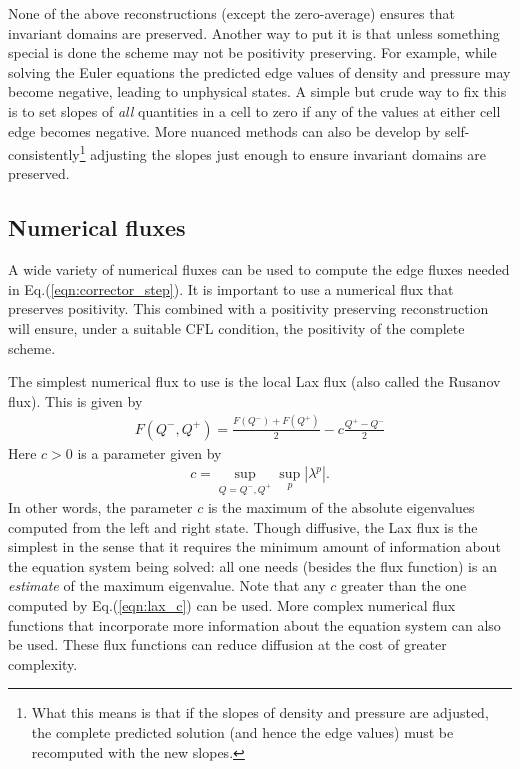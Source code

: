 \documentclass[12pt]{article}
\theoremstyle{definition}
\theoremstyle{definition}
\theoremstyle{definition}
\newcommand{\eqr}[1]{Eq.\thinspace(#1)}
\begin{document}
None of the above reconstructions (except the zero-average) ensures
that invariant domains are preserved. Another way to put it is that
unless something special is done the scheme may not be positivity
preserving. For example, while solving the Euler equations the
predicted edge values of density and pressure may become negative,
leading to unphysical states. A simple but crude way to fix this is to
set slopes of \emph{all} quantities in a cell to zero if any of the
values at either cell edge becomes negative. More nuanced methods can
also be develop by self-consistently\footnote{What this means is that
  if the slopes of density and pressure are adjusted, the complete
  predicted solution (and hence the edge values) must be recomputed
  with the new slopes.} adjusting the slopes just enough to ensure
invariant domains are preserved.

\subsection{Numerical fluxes}

A wide variety of numerical fluxes can be used to compute the edge
fluxes needed in \eqr{\ref{eqn:corrector_step}}. It is important to
use a numerical flux that preserves positivity. This combined with a
positivity preserving reconstruction will ensure, under a suitable CFL
condition, the positivity of the complete scheme.

The simplest numerical flux to use is the local Lax flux (also called
the Rusanov flux). This is given by
\begin{align}
  F(Q^-,Q^+) = \frac{F(Q^-) + F(Q^+)}{2} - c\frac{Q^+- Q^-}{2}
\end{align}
Here $c>0$ is a parameter given by
\begin{align}
  c = \sup_{Q=Q^-,Q^+} \sup_p | \lambda^p |. \label{eqn:lax_c}
\end{align}
In other words, the parameter $c$ is the maximum of the absolute
eigenvalues computed from the left and right state. Though diffusive,
the Lax flux is the simplest in the sense that it requires the minimum
amount of information about the equation system being solved: all one
needs (besides the flux function) is an \emph{estimate} of the maximum
eigenvalue. Note that any $c$ greater than the one computed by
\eqr{\ref{eqn:lax_c}} can be used. More complex numerical flux
functions that incorporate more information about the equation system
can also be used. These flux functions can reduce diffusion at the
cost of greater complexity.
\end{document}
